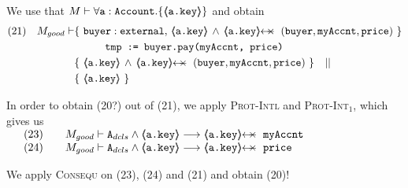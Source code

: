 \begin{proofO}
We use that $M \vdash \forall {\mbox{\normalfont{\texttt{a}}}:\mbox{\normalfont{\texttt{Account}}}}.{{\{}}{\langle\!\!\langle \mbox{\normalfont{\texttt{a.key}}} \rangle\!\!\rangle}{{\}}}$
 and  obtain
 \\
 \small
\begin{align*}
\text{(21)} \ \ \ M_{good} \vdash & \{ \ \prg{buyer}:\prg{external},\,  {\inside{\prg{a.key}}} \, \wedge\, 
\protectedFrom {\prg{a.key}} {(\prg{buyer},\prg{myAccnt},\prg{price})} \  \} \\
		  		& \SPT  \prg{tmp := buyer.pay(myAccnt, price)}\ \\  
		  		& \{ \ \inside{\prg{a.key}} \, \wedge\, 
\protectedFrom {\prg{a.key}} {(\prg{buyer},\prg{myAccnt},\prg{price})}\ \} \ \ \  || \ \ \  \\
		  		&   \{ \   {\inside{\prg{a.key}}}\  \}
\end{align*}
\normalsize 
 
In order to obtain (20?) out of (21), we apply \textsc{Prot-Intl} and \textsc{Prot-Int}$_1$,   which gives us\\
$
\begin{array}{llll}
& (23) & & M_{good} \vdash \Alocals \wedge  {\inside{\prg{a.key}}}  \longrightarrow \protectedFrom {\prg{a.key}} {\prg{myAccnt}} 
\\
& (24) & & M_{good} \vdash \Alocals \wedge  {\inside{\prg{a.key}}}  \longrightarrow \protectedFrom {\prg{a.key}} {\prg{price}} 
\end{array}
$

We apply {\textsc{Consequ}} on (23), (24) and (21) and obtain (20)!

\normalsize



\end{proofO}
